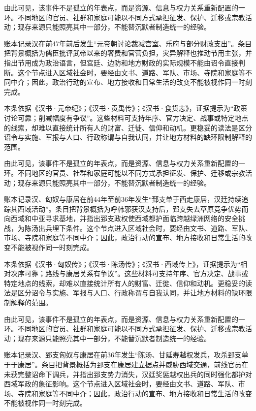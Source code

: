 由此可见，该事件不是孤立的年表点，而是资源、信息与权力关系重新配置的一环。不同地区的官员、社群和家庭可能以不同方式承担征发、保护、迁移或宗教活动；现存来源只能照亮其中一部分，不能替沉默者制造统一的经验。

账本记录汉在前47年前后发生“元帝朝讨论裁减宫室、乐府与部分财政支出”。条目把背景概括为儒臣批评武帝以来的奢费和官营负担，灾异解释也推动节用主张，并指出节用成为政治语言，但宫廷、边防和地方财政的实际规模不能由诏令直接判断。这个节点进入区域社会时，要经由文书、道路、军队、市场、寺院和家庭等不同中介；因此，政治行动的宣布、地方接收和日常生活的改变不能被视作同一时刻完成。

本条依据《汉书·元帝纪》；《汉书·贡禹传》；《汉书·食货志》，证据提示为“政策讨论可靠；削减幅度有争议”。这些材料可支持年序、官方决定、战事或特定地点的线索，却难以直接统计所有人的财富、迁徙、信仰和动机。更稳妥的读法是区分诏令与实施、军报与人口、行政称谓与自我认同，并让地方材料的缺环限制解释的范围。

由此可见，该事件不是孤立的年表点，而是资源、信息与权力关系重新配置的一环。不同地区的官员、社群和家庭可能以不同方式承担征发、保护、迁移或宗教活动；现存来源只能照亮其中一部分，不能替沉默者制造统一的经验。

账本记录汉、匈奴与康居在前44年至前36年发生“郅支单于西走康居，汉廷持续追踪其西域活动”。条目把背景概括为呼韩邪获汉支持后，郅支失去草原竞争优势而向西域和中亚寻求基地，并指出郅支政权使西域都护面临跨越绿洲网络的安全挑战，为陈汤出兵埋下条件。这个节点进入区域社会时，要经由文书、道路、军队、市场、寺院和家庭等不同中介；因此，政治行动的宣布、地方接收和日常生活的改变不能被视作同一时刻完成。

本条依据《汉书·匈奴传》；《汉书·陈汤传》；《汉书·西域传上》，证据提示为“相对次序可靠；路线与康居关系有争议”。这些材料可支持年序、官方决定、战事或特定地点的线索，却难以直接统计所有人的财富、迁徙、信仰和动机。更稳妥的读法是区分诏令与实施、军报与人口、行政称谓与自我认同，并让地方材料的缺环限制解释的范围。

由此可见，该事件不是孤立的年表点，而是资源、信息与权力关系重新配置的一环。不同地区的官员、社群和家庭可能以不同方式承担征发、保护、迁移或宗教活动；现存来源只能照亮其中一部分，不能替沉默者制造统一的经验。

账本记录汉、郅支匈奴与康居在前36年发生“陈汤、甘延寿越权发兵，攻杀郅支单于于康居”。条目把背景概括为郅支在康居建立据点并威胁西域交通，前线官员在未获完整诏命下调兵，并指出郅支势力消失，汉廷奖惩越权出兵的同时强化都护对西域军政的象征影响。这个节点进入区域社会时，要经由文书、道路、军队、市场、寺院和家庭等不同中介；因此，政治行动的宣布、地方接收和日常生活的改变不能被视作同一时刻完成。

